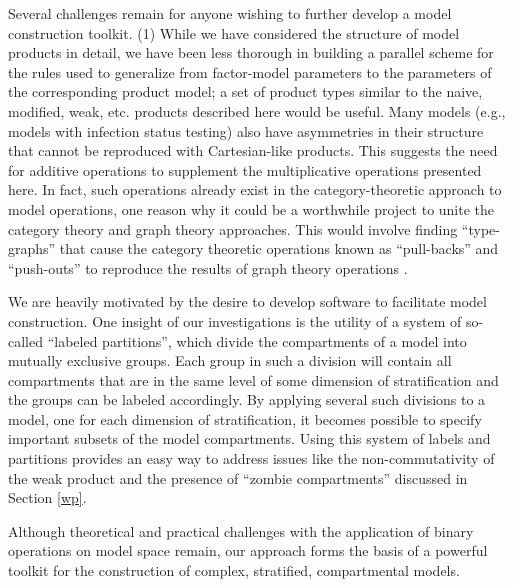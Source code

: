 Several challenges remain for anyone wishing to further develop a model construction toolkit. (1) While we have considered the structure of model products in detail, we have been less thorough in building a parallel scheme for the rules used to generalize from factor-model parameters to the parameters of the corresponding product model; a set of product types similar to the naive, modified, weak, etc. products described here would be useful. Many models (e.g., models with infection status testing) also have asymmetries in their structure that cannot be reproduced with Cartesian-like products. This suggests the need for additive operations to supplement the multiplicative operations presented here. In fact, such operations already exist in the category-theoretic approach to model operations, one reason why it could be a worthwhile project to unite the category theory and graph theory approaches. This would involve finding ``type-graphs'' that cause the category theoretic operations known as ``pull-backs'' and ``push-outs'' to  reproduce the results of graph theory operations \citep{fong2018seven, Libkind2022an, libkind2021operadic, baez2023categorical, baez2017compositional}.

We are heavily motivated by the desire to develop software to facilitate model construction. One insight of our investigations is the utility of a system of so-called ``labeled partitions'', which divide the compartments of a model into mutually exclusive groups. Each group in such a division will contain all compartments that are in the same level of some dimension of stratification and the groups can be labeled accordingly. By applying several such divisions to a model, one for each dimension of stratification, it becomes possible to specify important subsets of the model compartments. Using this system of labels and partitions provides an easy way to address issues like the non-commutativity of the weak product and the presence of ``zombie compartments'' discussed in Section \ref{wp}.

Although theoretical and practical challenges with the application of binary operations on model space remain, our approach forms the basis of a powerful toolkit for the construction of complex, stratified, compartmental models.

